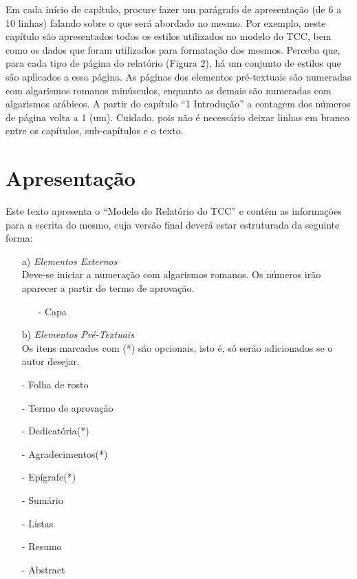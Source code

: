 \documentclass[pnumromarab, normaltoc, a4paper, 12pt]{abnt-unochapeco}
\begin{document}
Em cada início de capítulo, procure fazer um parágrafo de apresentação (de 6 a
10 linhas) falando sobre o que será abordado no mesmo. Por exemplo, neste
capítulo são apresentados todos os estilos utilizados no modelo do TCC,  bem
como os dados que foram utilizados para formatação dos mesmos. Perceba que, para
cada tipo de página do relatório (Figura 2), há um conjunto de estilos que são
aplicados a essa página. As páginas dos elementos pré-textuais são numeradas com
algarismos romanos minúsculos, enquanto as demais são numeradas com algarismos
arábicos. A partir do capítulo ``1 Introdução'' a contagem dos números de página
volta a 1 (um). Cuidado, pois não é necessário deixar linhas em branco entre os
capítulos, sub-capítulos e o texto.

\section{Apresentação}
Este texto apresenta o ``Modelo do Relatório do TCC'' e contém as informações
para a escrita do mesmo, cuja versão final deverá estar estruturada da seguinte
forma:

\begin{itemize}
  \leading{5mm}
  \item [a)] \emph{Elementos Externos} \\ Deve-se iniciar a numeração com
algarismos romanos. Os números irão aparecer
a partir do termo de aprovação.
  \begin{itemize}
    \item [-] Capa
  \end{itemize}
\end{itemize}

\begin{itemize}
  \leading{5mm}
  \item [b)] \emph{ Elementos Pré-Textuais} \\
  Os itens marcados com (*) são opcionais, isto é, só serão adicionados se o
  autor desejar.
  \item [-] Folha de rosto
  \item [-] Termo de aprovação
  \item [-] Dedicatória(*)
  \item [-] Agradecimentos(*)
  \item [-] Epígrafe(*)
  \item [-] Sumário
  \item [-] Listas
  \item [-] Resumo
  \item [-] Abstract
\end{itemize}
\end{document}
